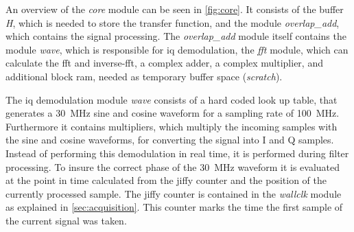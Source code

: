 \documentclass[12pt,a4paper,parskip=full,abstract=true,BCOR=12mm,twoside,open=right]{scrreprt}
\def\device#1{\mbox{\textit{#1}}}
\begin{document}
An overview of the \device{core} module can be seen in \cref{fig:core}.
It consists of the buffer \device{H}, which is needed to store the transfer
function, and the module \device{overlap\_add}, which contains the signal
processing. The \device{overlap\_add}
module itself contains the module \device{wave}, which is responsible for \gls{iq}
demodulation, the \device{fft} module, which can calculate the \gls{fft} and
inverse-\gls{fft}, a complex adder, a complex multiplier, and additional block
\gls{ram}, needed as temporary buffer space (\device{scratch}).

The \gls{iq} demodulation module \device{wave} consists of a hard coded look up
table, that generates a \SI{30}{\mega\hertz} sine and cosine waveform for
a sampling rate of \SI{100}{\mega\hertz}. Furthermore it contains multipliers,
which multiply the incoming samples with the sine and cosine waveforms, for
converting the signal into I and Q samples. Instead of performing this demodulation
in real time, it is performed during filter processing. To insure the correct phase
of the \SI{30}{\mega\hertz} waveform it is evaluated at the point in time calculated
from the jiffy counter and the position of the currently processed sample. The jiffy
counter is contained in the \device{wallclk} module as explained in
\cref{sec:acquisition}. This counter marks the time the first sample of the current
signal was taken.
\end{document}
